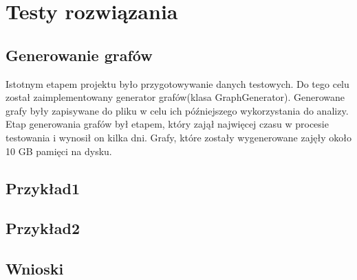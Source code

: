 \section{Testy rozwiązania}
	\label{final:testy}

	\subsection{Generowanie grafów}
		\label{final:testy:generowanie}

		Istotnym etapem projektu było przygotowywanie danych testowych. Do tego celu został zaimplementowany generator grafów(klasa GraphGenerator). Generowane grafy były zapisywane do pliku w celu ich późniejszego wykorzystania do analizy. Etap generowania grafów był etapem, który zajął najwięcej czasu w procesie testowania i wynosił on kilka dni. Grafy, które zostały wygenerowane zajęły około 10 GB pamięci na dysku.
	\subsection{Przykład1}
		\label{final:testy:przyklad1}

	\subsection{Przykład2}
		\label{final:testy:przyklad2}

	\subsection{Wnioski}
		\label{final:testy:wnioski}
